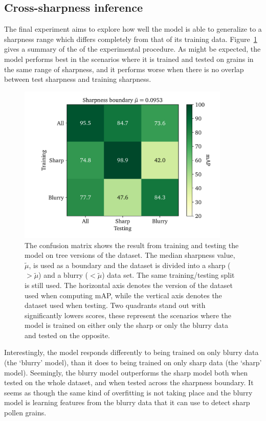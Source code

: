\subsection{Cross-sharpness inference}
The final experiment aims to explore how well the model is able to generalize to a sharpness range which differs completely from that of its training data.
Figure~\ref{fig:results-sharpness-inference} gives a summary of the of the experimental procedure.
As might be expected, the model performs best in the scenarios where it is trained and tested on grains in the same range of sharpness, and it performs worse when there is no overlap between test sharpness and training sharpness.

\begin{figure}[htbp]
  \centering
  \includegraphics[width=0.9\textwidth]{figs/results/sharpness/confustion_balanced_test_map.pdf}
  \caption[mAP across sharpness boundary]{%
The confusion matrix shows the result from training and testing the model on tree versions of the dataset.
The median sharpness value, \(\tilde{\mu}\), is used as a boundary and the dataset is divided into a sharp (\(>\tilde{\mu}\)) and a blurry (\(<\tilde{\mu}\)) data set.
The same training/testing split is still used.
The horizontal axis denotes the version of the dataset used when computing mAP, while the vertical axis denotes the dataset used when testing.
Two quadrants stand out with significantly lowers scores,  these represent the scenarios where the model is trained on either only the sharp or only the blurry data and tested on the opposite.
  }\label{fig:results-sharpness-inference}
\end{figure}

Interestingly, the model responds differently to being trained on only blurry data (the `blurry' model), than it does to being trained on only sharp data (the `sharp' model).
Seemingly, the blurry model outperforms the sharp model both when tested on the whole dataset, and when tested across the sharpness boundary.
It seems as though the same kind of overfitting is not taking place and the blurry model is learning features from the blurry data that it can use to detect sharp pollen grains.

